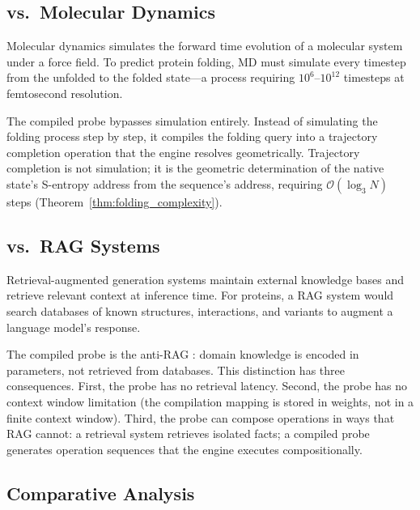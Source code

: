 \documentclass[11pt,twocolumn,a4paper]{article}
\theoremstyle{definition}
\theoremstyle{remark}
\begin{document}
\subsection{vs.\ Molecular Dynamics}

Molecular dynamics \citep{karplus2002} simulates the forward time evolution of a molecular system under a force field. To predict protein folding, MD must simulate every timestep from the unfolded to the folded state---a process requiring $10^{6}$--$10^{12}$ timesteps at femtosecond resolution.

The compiled probe bypasses simulation entirely. Instead of simulating the folding process step by step, it compiles the folding query into a trajectory completion operation that the engine resolves geometrically. Trajectory completion is not simulation; it is the geometric determination of the native state's S-entropy address from the sequence's address, requiring $\mathcal{O}(\log_3 N)$ steps (Theorem~\ref{thm:folding_complexity}).

\subsection{vs.\ RAG Systems}

Retrieval-augmented generation systems maintain external knowledge bases and retrieve relevant context at inference time. For proteins, a RAG system would search databases of known structures, interactions, and variants to augment a language model's response.

The compiled probe is the anti-RAG \citep{purpose2024}: domain knowledge is encoded in parameters, not retrieved from databases. This distinction has three consequences. First, the probe has no retrieval latency. Second, the probe has no context window limitation (the compilation mapping is stored in weights, not in a finite context window). Third, the probe can compose operations in ways that RAG cannot: a retrieval system retrieves isolated facts; a compiled probe generates operation sequences that the engine executes compositionally.

\subsection{Comparative Analysis}
\end{document}

